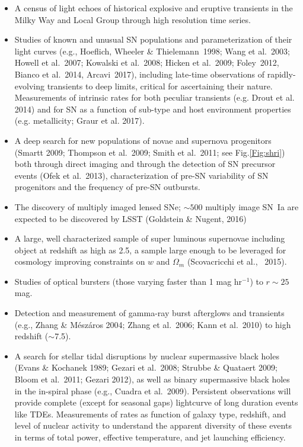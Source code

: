 \begin{itemize}
\item A census of light echoes of historical explosive and eruptive
  transients in the Milky Way and Local Group through high resolution
  time series​.

\item Studies of known and unusual SN populations and parameterization of their light curves (e.g., Hoeflich, Wheeler \& Thielemann~1998; Wang et al.~2003; Howell et al.~2007; Kowalski et al.~2008; Hicken et al.~2009; Foley~2012​, Bianco et al.~2014, Arcavi~2017​), including late-time observations of rapidly-evolving transients to deep limits, critical for ascertaining their nature. Measurements of intrinsic rates for both peculiar transients (e.g. Drout et al. 2014) and for SN as a function of sub-type and host environment properties (e.g. metallicity; Graur et al. 2017). 

\item A deep search for new populations of novae and supernova progenitors 
      (Smartt 2009; Thompson et al.~2009; Smith et al.~2011; see Fig.\ref{Fig:shri}) both through direct imaging and through the detection of SN precursor events (Ofek et al.~2013), characterization of pre-SN variability of SN progenitors and the frequency of pre-SN outbursts.

\item The discovery of multiply imaged lensed SNe; $\sim500$ multiply
  image SN~Ia are expected to be discovered by LSST (Goldstein \&
  Nugent, 2016)

\item A large, well characterized sample of super luminous supernovae
including object at redshift as high as 2.5, a sample large enough to be leveraged for cosmology  improving constraints on $w$ and $\Omega_m$ (Scovacricchi et al., ~2015).

\item Studies of optical bursters (those varying faster than 1 mag hr$^{-1}$) to $r\sim25$ mag. 

\item Detection and measurement of gamma-ray burst afterglows and transients 
      (e.g., Zhang \& M\'{e}sz\'{a}ros 2004; Zhang et al.~2006; Kann et al.~2010) to high redshift ($\sim$7.5).
 
\item A search for stellar tidal disruptions by nuclear supermassive
  black holes (Evans \& Kochanek 1989; Gezari et al.~2008; Strubbe \&
  Quataert 2009; Bloom et al.~2011; Gezari 2012), as well as binary
  supermassive black holes in the in-spiral phase (e.g., Cuadra et
  al.~2009). Persistent observations will provide complete (except for
  seasonal gaps) lightcurve of long duration events like
  TDEs. Measurements of rates as function of galaxy type, redshift,
  and level of nuclear activity to understand the apparent diversity
  of these events in terms of total power, effective temperature, and
  jet launching efficiency.




\end{itemize}
